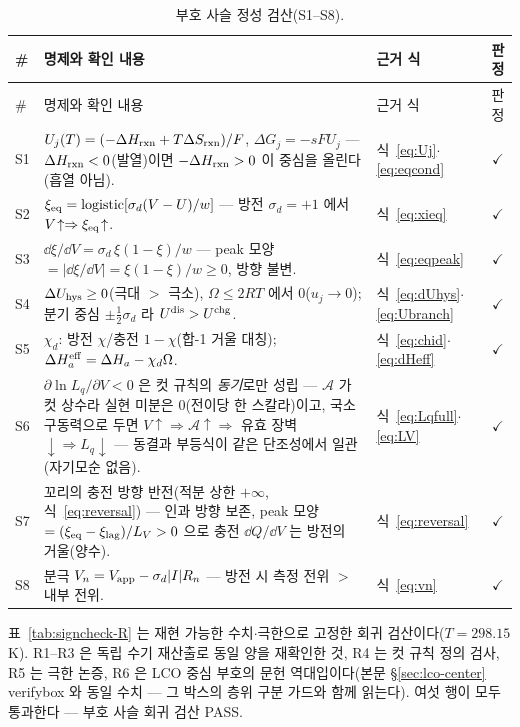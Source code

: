\begin{longtable}{@{}l p{8.6cm} p{3.3cm} c@{}}
\caption{부호 사슬 정성 검산(S1--S8).}\label{tab:signcheck-S}\\
\toprule
\# & 명제와 확인 내용 & 근거 식 & 판정 \\
\midrule
\endfirsthead
\toprule
\# & 명제와 확인 내용 & 근거 식 & 판정 \\
\midrule
\endhead
S1 & $U_j(T)=(-\Delta H_{\mathrm{rxn}}+T\Delta S_{\mathrm{rxn}})/F$, $\Delta G_j=-sFU_j$ --- $\Delta H_{\mathrm{rxn}}<0$(발열)이면
$-\Delta H_{\mathrm{rxn}}>0$ 이 중심을 올린다(흡열 아님). & 식~\eqref{eq:Uj}$\cdot$\eqref{eq:eqcond} & $\checkmark$ \\
S2 & $\xi_{\mathrm{eq}}=\mathrm{logistic}[\sigma_d(V-U)/w]$ --- 방전 $\sigma_d=+1$ 에서
$V\!\uparrow\Rightarrow\xi_{\mathrm{eq}}\!\uparrow$. & 식~\eqref{eq:xieq} & $\checkmark$ \\
S3 & $\dd\xi/\dd V=\sigma_d\,\xi(1-\xi)/w$ --- peak 모양 $=|\dd\xi/\dd V|=\xi(1-\xi)/w\ge0$, 방향 불변.
& 식~\eqref{eq:eqpeak} & $\checkmark$ \\
S4 & $\Delta U_{\mathrm{hys}}\ge0$(극대 $>$ 극소), $\Omega\le2RT$ 에서 $0$($u_j\to0$); 분기 중심 $\pm\tfrac12\sigma_d$
라 $U^{\mathrm{dis}}>U^{\mathrm{chg}}$. & 식~\eqref{eq:dUhys}$\cdot$ \eqref{eq:Ubranch} & $\checkmark$ \\
S5 & $\chi_d$: 방전 $\chi$/충전 $1-\chi$(합-1 거울 대칭); $\Delta H_a^{\mathrm{eff}}=\Delta H_a-\chi_d\Omega$.
& 식~\eqref{eq:chid}$\cdot$\eqref{eq:dHeff} & $\checkmark$ \\
S6 & $\partial\ln L_q/\partial V<0$ 은 컷 규칙의 \emph{동기}로만 성립 --- $\mathcal A$ 가 컷 상수라 실현
미분은 $0$(전이당 한 스칼라)이고, 국소 구동력으로 두면 $V\!\uparrow\Rightarrow\mathcal
A\!\uparrow\Rightarrow$ 유효 장벽 $\downarrow\Rightarrow L_q\downarrow$ --- 동결과 부등식이 같은
단조성에서 일관(자기모순 없음). & 식~\eqref{eq:Lqfull}$\cdot$\eqref{eq:LV} & $\checkmark$ \\
S7 & 꼬리의 충전 방향 반전(적분 상한 $+\infty$, 식~\eqref{eq:reversal}) --- 인과 방향 보존,
peak 모양 $=(\xi_{\mathrm{eq}}-\xi_\mathrm{lag})/L_V>0$ 으로 충전 $\dd Q/\dd V$ 는 방전의 거울(양수).
& 식~\eqref{eq:reversal} & $\checkmark$ \\
S8 & 분극 $V_n=V_{\mathrm{app}}-\sigma_d|I|R_n$ --- 방전 시 측정 전위 $>$ 내부 전위. & 식~\eqref{eq:vn} & $\checkmark$ \\
\bottomrule
\end{longtable}

표~\ref{tab:signcheck-R} 는 재현 가능한 수치$\cdot$극한으로 고정한 회귀 검산이다($T=298.15$ K).
R1--R3 은 독립 수기 재산출로 동일 양을 재확인한 것, R4 는 컷 규칙 정의 검사, R5 는 극한 논증,
R6 은 LCO 중심 부호의 문헌 역대입이다(본문 \S\ref{sec:lco-center} verifybox 와 동일 수치 ---
그 박스의 층위 구분 가드와 함께 읽는다). 여섯 행이 모두 통과한다 --- 부호 사슬 회귀 검산 PASS.

